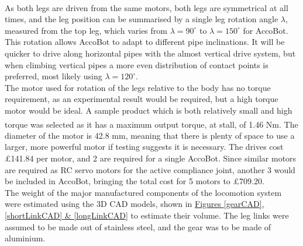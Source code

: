 \documentclass[11pt]{article}		%
\newcommand{\supercite}[1]{\textsuperscript{\cite{#1}}}		%
\begin{document}
				\\
                \hspace*{2ex}As both legs are driven from the same motors, both legs are symmetrical at all times, and the leg position can be summarised by a single leg rotation angle $\lambda$, measured from the top leg, which varies from $\lambda = 90^\circ$ to $\lambda = 150^\circ$ for AccoBot.
				This rotation allows AccoBot to adapt to different pipe inclinations.
				It will be quicker to drive along horizontal pipes with the almost vertical drive system, but when climbing vertical pipes a more even distribution of contact points is preferred, most likely using $\lambda = 120^\circ$.
				\\
                \hspace*{2ex}The motor used for rotation of the legs relative to the body has no torque requirement, as an experimental result would be required, but a high torque motor would be ideal.
				A sample product which is both relatively small and high torque was selected\supercite{rsproRotation} as it has a maximum output torque, at stall, of 1.46 Nm.
				The diameter of the motor is 42.8 mm, meaning that there is plenty of space to use a larger, more powerful motor if testing suggests it is necessary.
				The drives cost £141.84 per motor, and 2 are required for a single AccoBot.
				Since similar motors are required as RC servo motors for the active compliance joint, another 3 would be included in AccoBot, bringing the total cost for 5 motors to £709.20.
				\\
                \hspace*{2ex}The weight of the major manufactured components of the locomotion system were estimated using the 3D CAD models, shown in \hyperref[gearCAD]{Figures \ref*{gearCAD}, \ref*{shortLinkCAD} \& \ref*{longLinkCAD}} to estimate their volume.
				The leg links were assumed to be made out of stainless steel, and the gear was to be made of aluminium.
\end{document}
